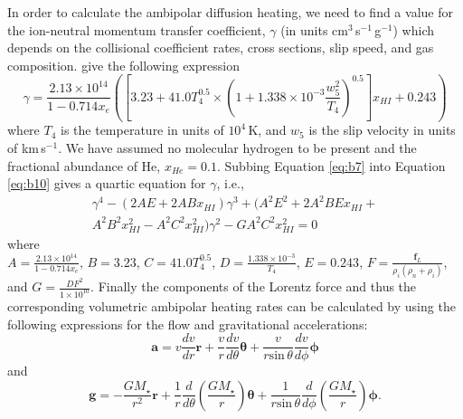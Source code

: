 In order to calculate the ambipolar diffusion heating, we need to find a value for the ion-neutral momentum transfer coefficient, $\gamma$ (in units cm$^3$\,s$^{-1}$\,g$^{-1}$) which depends on the collisional coefficient rates, cross sections, slip speed, and gas composition. \cite{shang_2002} give the following expression
\begin{equation}\label{eq:b10}
\gamma =\frac{2.13\times 10^{14}}{1-0.714x_{e}}\left( \left[ 3.23 +41.0T_{4}^{0.5}\times \left(1+1.338\times 10^{-3}\frac{w_{5}^{2}}{T_{4}} \right)^{0.5}\right]x_{HI}+0.243\right)
\end{equation} 
where $T_{4}$ is the temperature in units of $10^4$\,K, and $w_{5}$ is the slip velocity in units of km\,s$^{-1}$. We have assumed no molecular hydrogen to be present and the fractional abundance of He, $x_{He}=0.1$.  Subbing Equation \ref{eq:b7} into Equation \ref{eq:b10} gives a quartic equation for $\gamma$, i.e., 
\begin{eqnarray*}
\gamma^{4}-(2AE + 2ABx_{HI})\gamma^{3} + (A^{2}E^{2} + 2A^{2}BEx_{HI} + \\ A^{2}B^{2}x_{HI}^{2}-A^{2}C^{2}x_{HI}^{2})\gamma^{2} - GA^{2}C^{2}x_{HI}^{2} = 0
\end{eqnarray*} 
where\\
$A=\frac{2.13\times 10^{14}}{1-0.714x_{e}}$, $B=3.23$, $C=41.0T^{0.5}_{4}$, $D=\frac{1.338\times 10^{-3}}{T_{4}}$, $E=0.243$, $F=\frac{\pmb{f} _{L}}{\rho_{i}(\rho_{n}+\rho_{i})}$, and $G=\frac{DF^{2}}{1\times10^{10}}$. Finally the components of the Lorentz force and thus the corresponding volumetric ambipolar heating rates can be calculated by using the following expressions for the flow and gravitational accelerations:
\begin{equation}
\pmb{a} = v\frac{dv}{dr}\pmb{r} + \frac{v}{r}\frac{dv}{d\theta}\pmb{\theta}+\frac{v}{r\mathrm{sin}\,\theta}\frac{dv}{d\phi}\pmb{\phi}
\end{equation}
and
\begin{equation}
\pmb{g} = -\frac{GM_{\star}}{r^2}\pmb{r} + \frac{1}{r}\frac{d}{d\theta}\left(\frac{GM_{\star}}{r} \right)\pmb{\theta} +\frac{1}{r\mathrm{sin}\,\theta}\frac{d}{d\phi}\left(\frac{GM_{\star}}{r} \right)\pmb{\phi}.
\end{equation}
